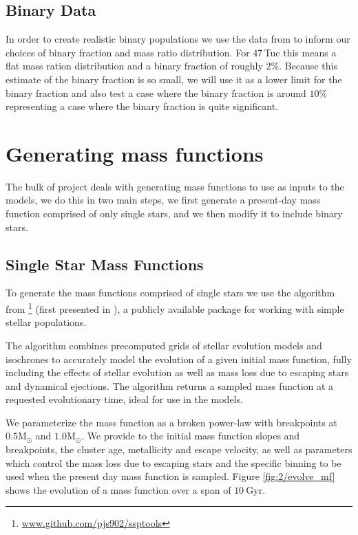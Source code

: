 \subsection{Binary Data}

In order to create realistic binary populations we use the data from \citet{Milone2012} to inform
our choices of binary fraction and mass ratio distribution. For 47\,Tuc this means a flat mass
ration distribution and a binary fraction of roughly $2\%$. Because this estimate of the binary
fraction is so small, we will use it as a lower limit for the binary fraction and also test a case
where the binary fraction is around $10\%$ representing a case where the binary fraction is quite
significant.




\section{Generating mass functions}

The bulk of project deals with generating mass functions to use as inputs to the 
models, we do this in two main steps, we first generate a present-day mass function comprised of
only single stars, and we then modify it to include binary stars.

\subsection{Single Star Mass Functions}


To generate the mass functions comprised of single stars we use the \evolvemf{} algorithm from
\footnote{\url{www.github.com/pjs902/ssptools}} (first presented in
\citealt{Balbinot2018}), a publicly available package for working with simple stellar populations.

The \evolvemf{} algorithm combines precomputed grids of stellar evolution models and isochrones to
accurately model the evolution of a given initial mass function, fully including the effects of
stellar evolution as well as mass loss due to escaping stars and dynamical ejections. The algorithm
returns a sampled mass function at a requested evolutionary time, ideal for use in the 
models.

We parameterize the mass function as a broken power-law with breakpoints at $0.5 \mathrm{M}_\odot$
and $1.0 \mathrm{M}_\odot$. We provide to \evolvemf{} the initial mass function slopes and
breakpoints, the cluster age, metallicity and escape velocity, as well as parameters which control
the mass loss due to escaping stars and the specific binning to be used when the present day mass
function is sampled. Figure \ref{fig:2/evolve_mf} shows the evolution of a mass function over a span
of $10 \ \mathrm{Gyr}$.

